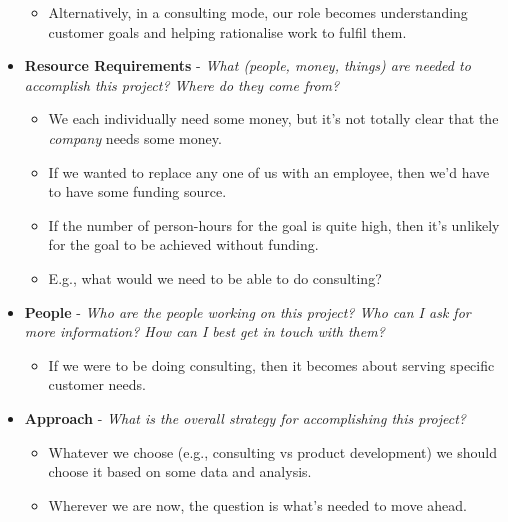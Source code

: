 \documentclass[11pt]{article}
\begin{document}
\begin{itemize}
\begin{itemize}
\item Alternatively, in a consulting mode, our role becomes understanding customer goals and helping rationalise work to fulfil them.
\end{itemize}
\item \textbf{Resource Requirements} - \emph{What (people, money, things) are needed to accomplish this project?  Where do they come from?}
\begin{itemize}
\item We each individually need some money, but it’s not totally clear that the \emph{company} needs some money.
\item If we wanted to replace any one of us with an employee, then we’d have to have some funding source.
\item If the number of person-hours for the goal is quite high, then it’s unlikely for the goal to be achieved without funding.
\item E.g., what would we need to be able to do consulting?
\end{itemize}
\item \textbf{People} - \emph{Who are the people working on this project? Who can I ask for more information? How can I best get in touch with them?}
\begin{itemize}
\item If we were to be doing consulting, then it becomes about serving specific customer needs.
\end{itemize}
\item \textbf{Approach} - \emph{What is the overall strategy for accomplishing this project?}
\begin{itemize}
\item Whatever we choose (e.g., consulting vs product development) we should choose it based on some data and analysis.
\item Wherever we are now, the question is what’s needed to move ahead.
\end{itemize}


\end{itemize}
\end{document}
